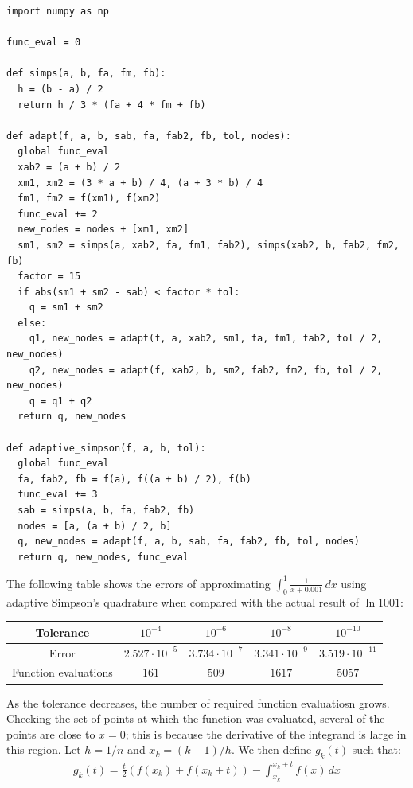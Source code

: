 \documentclass{article}
\begin{document}
\clearpage
\problem{}
\begin{lstlisting}
import numpy as np

func_eval = 0

def simps(a, b, fa, fm, fb):
  h = (b - a) / 2
  return h / 3 * (fa + 4 * fm + fb)

def adapt(f, a, b, sab, fa, fab2, fb, tol, nodes):
  global func_eval
  xab2 = (a + b) / 2
  xm1, xm2 = (3 * a + b) / 4, (a + 3 * b) / 4
  fm1, fm2 = f(xm1), f(xm2)
  func_eval += 2
  new_nodes = nodes + [xm1, xm2]
  sm1, sm2 = simps(a, xab2, fa, fm1, fab2), simps(xab2, b, fab2, fm2, fb)
  factor = 15
  if abs(sm1 + sm2 - sab) < factor * tol:
    q = sm1 + sm2
  else:
    q1, new_nodes = adapt(f, a, xab2, sm1, fa, fm1, fab2, tol / 2, new_nodes)
    q2, new_nodes = adapt(f, xab2, b, sm2, fab2, fm2, fb, tol / 2, new_nodes)
    q = q1 + q2
  return q, new_nodes

def adaptive_simpson(f, a, b, tol):
  global func_eval
  fa, fab2, fb = f(a), f((a + b) / 2), f(b)
  func_eval += 3
  sab = simps(a, b, fa, fab2, fb)
  nodes = [a, (a + b) / 2, b]
  q, new_nodes = adapt(f, a, b, sab, fa, fab2, fb, tol, nodes)
  return q, new_nodes, func_eval
\end{lstlisting}
The following table shows the errors of approximating $\int_0^1 \frac{1}{x + 0.001} \, dx$ using adaptive Simpson's quadrature when compared with the actual result of $\ln 1001$:
\begin{center}
\begin{tabular}{|c|c|c|c|c|}
    \hline
    Tolerance & $10^{-4}$ & $10^{-6}$ & $10^{-8}$ & $10^{-10}$ \\
    \hline
    Error & $2.527 \cdot 10^{-5}$ & $3.734 \cdot 10^{-7}$ & $3.341 \cdot 10^{-9}$ & $3.519 \cdot 10^{-11}$ \\
    \hline
    Function evaluations & $161$ & $509$ & $1617$ & $5057$ \\
    \hline
\end{tabular}
\end{center}
As the tolerance decreases, the number of required function evaluatiosn grows. Checking the set of points at which the function was evaluated, several of the points are close to $x = 0$; this is because the derivative of the integrand is large in this region.
Let $h = 1/n$ and $x_k = (k - 1)/h$. We then define $g_k(t)$ such that:
\begin{align*}
    g_k(t) = \frac{t}{2}(f(x_k) + f(x_k + t)) - \int_{x_k}^{x_k + t} f(x) \, dx
\end{align*} 
\end{document}
